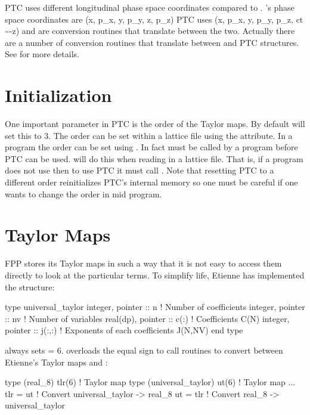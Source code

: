 PTC uses different longitudinal phase space coordinates compared to \bmad.
\bmad's phase space coordinates are
\Begineq
  (x, p_x, y, p_y, z, p_z)
\Endeq
PTC uses
\Begineq
  (x, p_x, y, p_y, p_z, ct \sim -z)
\Endeq
{} and  are conversion routines
that translate between the two. Actually there are a number of
conversion routines that translate between \bmad and PTC
structures. See  for more details.

\section{Initialization}
\label{s:etienne.init}

One important parameter in PTC is the order of the Taylor maps.
By default \bmad will set this to 3. The order can be set within
a lattice file using the  attribute.
In a program the order can be set using . In fact
 must be called by a program before PTC can be used.
 will do this when reading in a lattice file.
That is, if a program does not use  then to use PTC it
must call . Note that resetting PTC to a different order
reinitializes PTC's internal memory so one must be careful if one wants
to change the order in mid program.

\section{Taylor Maps}
\label{s:etienne.taylor}

FPP stores its  Taylor maps in such a way that it is not
easy to access them directly to look at the particular terms. To
simplify life, Etienne has implemented the
structure:
\begin{example}
  type universal_taylor
    integer, pointer  :: n       ! Number of coefficients
    integer, pointer  :: nv      ! Number of variables
    real(dp), pointer :: c(:)    ! Coefficients C(N)
    integer, pointer  :: j(:,:)  ! Exponents of each coefficients J(N,NV)
  end type
\end{example}
\bmad always sets  = 6. \bmad overloads the equal sign to call 
routines to convert between Etienne's
 Taylor maps and :
\begin{example}
  type (real_8) tlr(6)           ! Taylor map
  type (universal_taylor) ut(6)  ! Taylor map
  ...
  tlr = ut                       ! Convert universal_taylor -> real_8
  ut = tlr                       ! Convert real_8 -> universal_taylor
\end{example}
